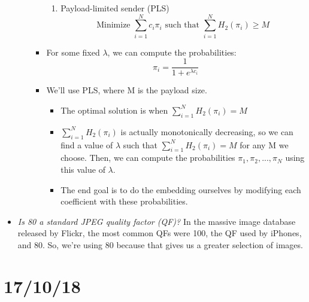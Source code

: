 \documentclass[11pt,a4paper]{report}
\begin{document}
\begin{itemize}
\begin{enumerate}
\begin{itemize}
\begin{enumerate}
      \item Payload-limited sender (PLS)
        \begin{equation*}
        \text{Minimize } \sum\limits_{i=1}^N c_i \pi_i \text{ such that } \sum\limits_{i=1}^N H_2(\pi_i) \geq M
        \end{equation*}
      \end{enumerate}

    \item For some fixed $\lambda$, we can compute the probabilities:
      \begin{equation*}
      \pi_i = \frac{1}{1+e^{\lambda c_i}}
      \end{equation*}

    \item We'll use PLS, where M is the payload size.
      \begin{itemize}
      \item The optimal solution is when $\sum\limits_{i=1}^N H_2(\pi_i) = M$
      \item $\sum\limits_{i=1}^N H_2(\pi_i)$ is actually monotonically decreasing, so we can find a value of $\lambda$ such that $\sum\limits_{i=1}^N H_2(\pi_i) = M$ for any M we choose. Then, we can compute the probabilities $\pi_1, \pi_2, ..., \pi_N$ using this value of $\lambda$.
      \item The end goal is to do the embedding ourselves by modifying each coefficient with these probabilities.
      \end{itemize}
    \end{itemize}

  \end{enumerate}

\item \textit{Is 80 a standard JPEG quality factor (QF)?} In the massive image database released by Flickr, the most common QFs were 100, the QF used by iPhones, and 80. So, we're using 80 because that gives us a greater selection of images.

\end{itemize}


\section{17/10/18}
\end{document}
